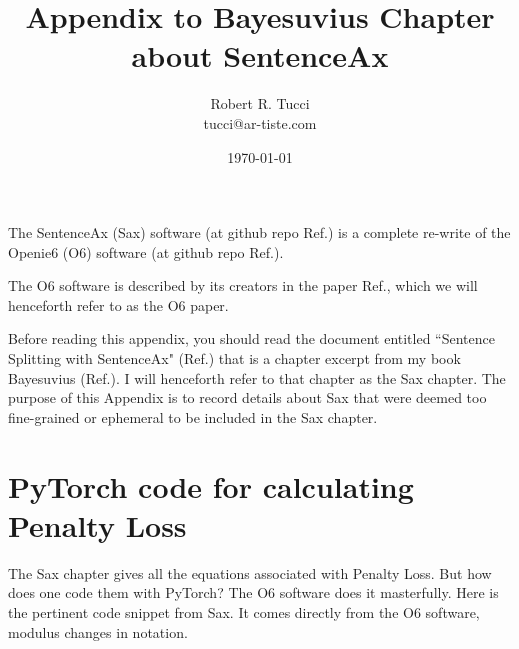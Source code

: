 \documentclass[12pt]{article}
\begin{document}
\title{Appendix
to Bayesuvius Chapter about SentenceAx}
\date{ \today}
\author{Robert R. Tucci\\
        tucci@ar-tiste.com}
\maketitle
The SentenceAx (Sax) software (at github repo Ref.\cite{sentence-ax-github}) is a complete re-write of the Openie6 (O6) software
(at github repo Ref.\cite{openie6-github}).

 The O6 software is described by its creators
 in the paper Ref.\cite{openie6-paper},
 which we will henceforth refer to as 
 the O6 paper.
 
 Before reading this appendix, you should read 
 the document entitled ``Sentence Splitting with SentenceAx" (Ref.\cite{openie6-paper}) that is a
 chapter 
 excerpt from my book Bayesuvius (Ref.\cite{bayesuvius}). I  will henceforth refer to that chapter as
 the Sax chapter. The purpose of this Appendix is to record details about Sax that were deemed too fine-grained or ephemeral to be included in the Sax chapter.


\section{PyTorch code for calculating Penalty Loss}

The Sax chapter gives all the equations
associated with Penalty Loss. But how does one   code them with PyTorch?  The O6 software does it masterfully. Here is the pertinent code snippet from Sax.
It comes directly from the O6 software, modulus changes in notation.
\end{document}
